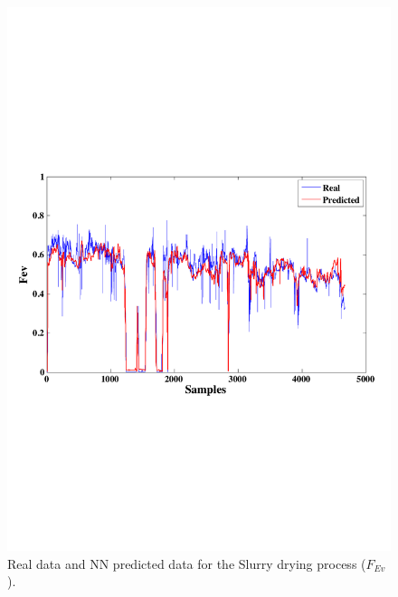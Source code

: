 \begin{figure}
\centering
\includegraphics[width=1\textwidth]{ANN-Evaporator.pdf}
\caption{Real data and NN predicted data for the Slurry drying process ($F_{Ev}$).}
\label{PEvaporator}
\end{figure}
